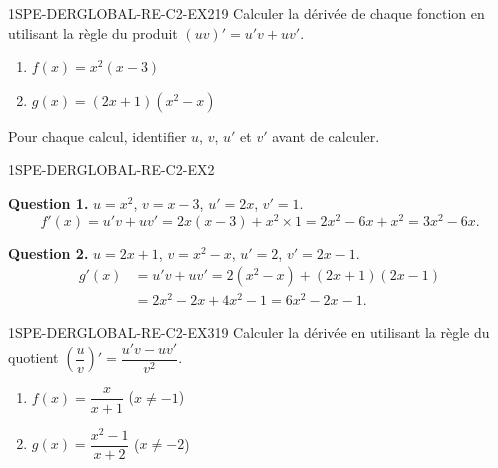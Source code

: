 \begin{exercice}{1SPE-DERGLOBAL-RE-C2-EX2}{1}{9}
Calculer la dérivée de chaque fonction en utilisant la règle du produit $(uv)' = u'v + uv'$.
\begin{enumerate}
  \item $f(x) = x^2(x - 3)$
  \item $g(x) = (2x + 1)(x^2 - x)$
\end{enumerate}
Pour chaque calcul, identifier $u$, $v$, $u'$ et $v'$ avant de calculer.
\end{exercice}


\begin{corrige}{1SPE-DERGLOBAL-RE-C2-EX2}

\textbf{Question 1.}
$u = x^2$, $v = x - 3$, $u' = 2x$, $v' = 1$.
\[
f'(x) = u'v + uv' = 2x(x-3) + x^2 \times 1 = 2x^2 - 6x + x^2 = 3x^2 - 6x.
\]


\textbf{Question 2.}
$u = 2x+1$, $v = x^2-x$, $u' = 2$, $v' = 2x-1$.
\begin{align*}
g'(x) &= u'v + uv' = 2(x^2-x) + (2x+1)(2x-1) \\
       &= 2x^2 - 2x + 4x^2 - 1 = 6x^2 - 2x - 1.
\end{align*}

\end{corrige}


\begin{exercice}{1SPE-DERGLOBAL-RE-C2-EX3}{1}{9}
Calculer la dérivée en utilisant la règle du quotient $\left(\dfrac{u}{v}\right)' = \dfrac{u'v - uv'}{v^2}$.
\begin{enumerate}
  \item $f(x) = \dfrac{x}{x+1}$ \quad ($x
\neq -1$)
  \item $g(x) = \dfrac{x^2 - 1}{x + 2}$ \quad ($x
\neq -2$)
\end{enumerate}
\end{exercice}


